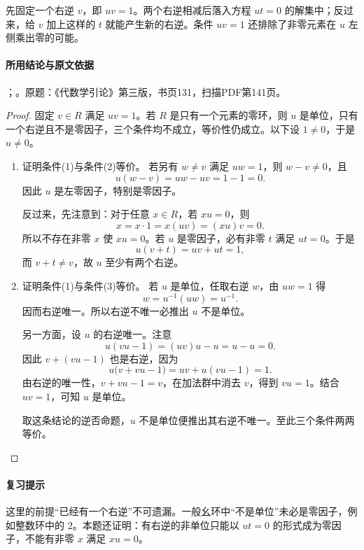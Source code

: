 先固定一个右逆 $v$，即 $uv=1$。两个右逆相减后落入方程 $ut=0$ 的解集中；反过来，给 $v$ 加上这样的 $t$ 就能产生新的右逆。条件 $uv=1$ 还排除了非零元素在 $u$ 左侧乘出零的可能。

\paragraph{所用结论与原文依据}

；。原题：《代数学引论》第三版，书页131，扫描PDF第141页。


\begin{proof}

固定 $v\in R$ 满足 $uv=1$。若 $R$ 是只有一个元素的零环，则 $u$ 是单位，只有一个右逆且不是零因子，三个条件均不成立，等价性仍成立。以下设 $1\ne0$，于是 $u\ne0$。

\begin{enumerate}\item 证明条件(1)与条件(2)等价。
若另有 $w\ne v$ 满足 $uw=1$，则 $w-v\ne0$，且
\[
u(w-v)=uw-uv=1-1=0.
\]
因此 $u$ 是左零因子，特别是零因子。

反过来，先注意到：对于任意 $x\in R$，若 $xu=0$，则
\[
x=x\cdot1=x(uv)=(xu)v=0.
\]
所以不存在非零 $x$ 使 $xu=0$。若 $u$ 是零因子，必有非零 $t$ 满足 $ut=0$。于是
\[
u(v+t)=uv+ut=1,
\]
而 $v+t\ne v$，故 $u$ 至少有两个右逆。

\item 证明条件(1)与条件(3)等价。
若 $u$ 是单位，任取右逆 $w$，由 $uw=1$ 得
\[
w=u^{-1}(uw)=u^{-1}.
\]
因而右逆唯一。所以右逆不唯一必推出 $u$ 不是单位。

另一方面，设 $u$ 的右逆唯一。注意
\[
u(vu-1)=(uv)u-u=u-u=0.
\]
因此 $v+(vu-1)$ 也是右逆，因为
\[
u\bigl(v+vu-1\bigr)=uv+u(vu-1)=1.
\]
由右逆的唯一性，$v+vu-1=v$，在加法群中消去 $v$，得到 $vu=1$。结合 $uv=1$，可知 $u$ 是单位。

取这条结论的逆否命题，$u$ 不是单位便推出其右逆不唯一。至此三个条件两两等价。
\end{enumerate}

\end{proof}

\paragraph{复习提示}

这里的前提“已经有一个右逆”不可遗漏。一般幺环中“不是单位”未必是零因子，例如整数环中的 $2$。本题还证明：有右逆的非单位只能以 $ut=0$ 的形式成为零因子，不能有非零 $x$ 满足 $xu=0$。



